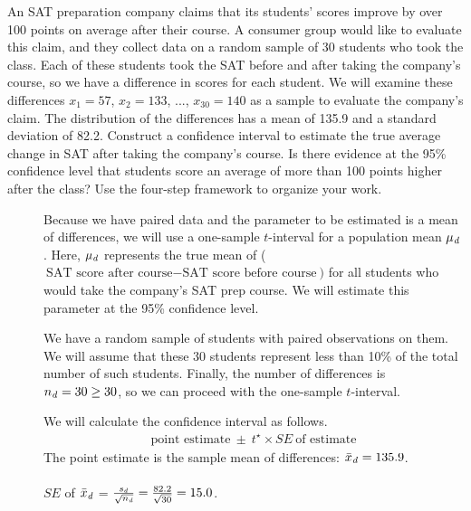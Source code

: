 \begin{examplewrap}
\begin{nexample}
{An SAT preparation company claims that its students' scores improve by over 100 points on average after their course. A consumer group would like to evaluate this claim, and they collect data on a random sample of 30 students who took the class. Each of these students took the SAT before and after taking the company's course, so we have a difference in scores for each student. We will examine these differences $x_1=57$, $x_2=133$, ..., $x_{30}=140$ as a sample to evaluate the company's claim. The distribution of the differences has a mean of 135.9 and a standard deviation of 82.2. Construct a confidence interval to estimate the true average change in SAT after taking the company's course.  Is there evidence at the 95\% confidence level that students score an average of more than 100 points higher after the class?  Use the four-step framework to organize your work.  
}
\begin{description}
\item[] Because we have paired data and the parameter to be estimated is a mean of differences, we will use a one-sample $t$-interval for a population mean $\mu_{\text{\emph{d}}}$.  Here, $\mu_{\text{\emph{d}}}$ represents the true mean of (${\text{SAT score after course} - \text{SAT score before course}})$ for all students who would take the company's SAT prep course.  We will estimate this parameter at the 95\% confidence level.

\item[] We have a random sample of students with paired observations on them.  We will assume that these 30 students represent less than 10\% of the total number of such students.  Finally, the number of differences is $n_{\text{\emph{d}}}=30\ge 30$, so we can proceed with the one-sample $t$-interval.  
 
\item[]  We will calculate the confidence interval as follows.
\begin{align*}
\text{point estimate}\ \pm\ t^{\star} \times SE\ \text{of estimate}
\end{align*}
The point estimate is the sample mean of differences: $\bar{x}_{\text{\emph{d}}} = 135.9$.\\
\\
$SE$ of $\bar{x}_{\text{\emph{d}}}$ = $ \frac{s_{\text{\emph{d}}}}{\sqrt{n_{\text{\emph{d}}}}} = \frac{82.2}{\sqrt{30}}=15.0$.\\


\end{description}
\end{nexample}
\end{examplewrap}
